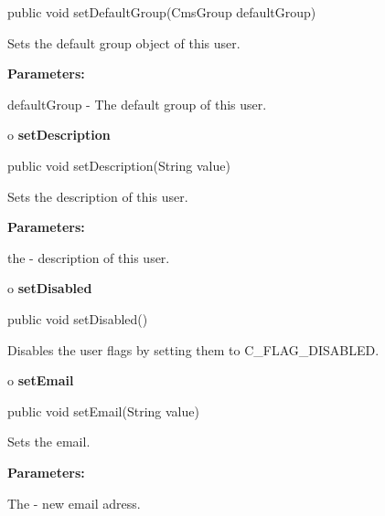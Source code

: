 \begin{PRE}
 public void setDefaultGroup(CmsGroup defaultGroup)
\end{PRE}

\begin{description}
\htmlDD Sets the default group object of this user. 

\begin{description}
\item {\bf Parameters:}  

defaultGroup - The default group of this user.  
\end{description}

\end{description}

o {\bf setDescription} 

\begin{PRE}
 public void setDescription(String value)
\end{PRE}

\begin{description}
\htmlDD Sets the description of this user. 

\begin{description}
\item {\bf Parameters:}  

the - description of this user.  
\end{description}

\end{description}

o {\bf setDisabled} 

\begin{PRE}
 public void setDisabled()
\end{PRE}

\begin{description}
\htmlDD Disables the user flags by setting them to C\_FLAG\_DISABLED. 

\end{description}

o {\bf setEmail} 

\begin{PRE}
 public void setEmail(String value)
\end{PRE}

\begin{description}
\htmlDD Sets the email. 

\begin{description}
\item {\bf Parameters:}  

The - new email adress.  
\end{description}

\end{description}

